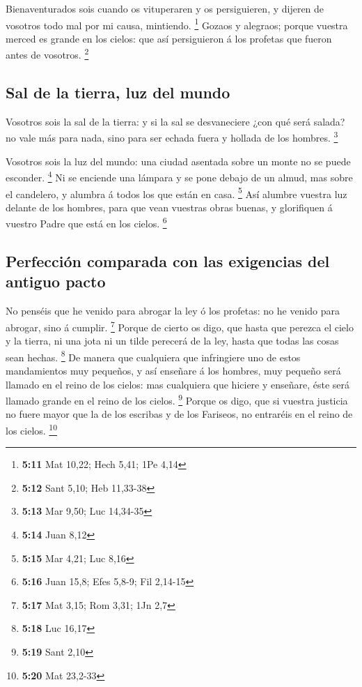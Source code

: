  Bienaventurados sois cuando os vituperaren y os
persiguieren, y dijeren de vosotros todo mal por mi causa, mintiendo.
\footnote{\textbf{5:11} Mat 10,22; Hech 5,41; 1Pe 4,14} 
Gozaos y alegraos; porque vuestra merced es grande en los cielos: que
así persiguieron á los profetas que fueron antes de vosotros.
\footnote{\textbf{5:12} Sant 5,10; Heb 11,33-38}

\hypertarget{sal-de-la-tierra-luz-del-mundo}{%
\subsection{Sal de la tierra, luz del
mundo}\label{sal-de-la-tierra-luz-del-mundo}}

 Vosotros sois la sal de la tierra: y si la sal se
desvaneciere ¿con qué será salada? no vale más para nada, sino para ser
echada fuera y hollada de los hombres. \footnote{\textbf{5:13} Mar 9,50;
  Luc 14,34-35}

 Vosotros sois la luz del mundo: una ciudad asentada sobre
un monte no se puede esconder. \footnote{\textbf{5:14} Juan 8,12}
 Ni se enciende una lámpara y se pone debajo de un almud,
mas sobre el candelero, y alumbra á todos los que están en casa.
\footnote{\textbf{5:15} Mar 4,21; Luc 8,16}  Así alumbre
vuestra luz delante de los hombres, para que vean vuestras obras buenas,
y glorifiquen á vuestro Padre que está en los cielos. \footnote{\textbf{5:16}
  Juan 15,8; Efes 5,8-9; Fil 2,14-15}

\hypertarget{perfecciuxf3n-comparada-con-las-exigencias-del-antiguo-pacto}{%
\subsection{Perfección comparada con las exigencias del antiguo
pacto}\label{perfecciuxf3n-comparada-con-las-exigencias-del-antiguo-pacto}}

 No penséis que he venido para abrogar la ley ó los
profetas: no he venido para abrogar, sino á cumplir. \footnote{\textbf{5:17}
  Mat 3,15; Rom 3,31; 1Jn 2,7}  Porque de cierto os digo,
que hasta que perezca el cielo y la tierra, ni una jota ni un tilde
perecerá de la ley, hasta que todas las cosas sean hechas. \footnote{\textbf{5:18}
  Luc 16,17}  De manera que cualquiera que infringiere uno
de estos mandamientos muy pequeños, y así enseñare á los hombres, muy
pequeño será llamado en el reino de los cielos: mas cualquiera que
hiciere y enseñare, éste será llamado grande en el reino de los cielos.
\footnote{\textbf{5:19} Sant 2,10}  Porque os digo, que si
vuestra justicia no fuere mayor que la de los escribas y de los
Fariseos, no entraréis en el reino de los cielos. \footnote{\textbf{5:20}
  Mat 23,2-33}

